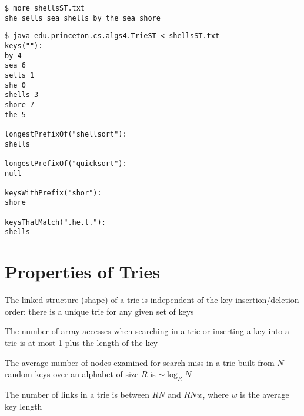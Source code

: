 \documentclass[8pt,a4paper,compress]{beamer}
\begin{document}
\begin{frame}[fragile]
\pause

\begin{lstlisting}[language={}]
$ more shellsST.txt 
she sells sea shells by the sea shore
\end{lstlisting}

\pause

\begin{lstlisting}[language={}]
$ java edu.princeton.cs.algs4.TrieST < shellsST.txt 
keys(""):
by 4
sea 6
sells 1
she 0
shells 3
shore 7
the 5

longestPrefixOf("shellsort"):
shells

longestPrefixOf("quicksort"):
null

keysWithPrefix("shor"):
shore

keysThatMatch(".he.l."):
shells
\end{lstlisting}
\end{frame}

\section{Properties of Tries}
\begin{frame}[fragile]
\pause

The linked structure (shape) of a trie is independent of the key insertion/deletion order: there is a unique trie for any given set of keys

\pause
\bigskip

The number of array accesses when searching in a trie or inserting
a key into a trie is at most 1 plus the length of the key

\pause
\bigskip

The average number of nodes examined for search miss in a trie built from $N$ random keys over an alphabet of size $R$ is $\sim \log_R N$

\pause
\bigskip

The number of links in a trie is between $RN$ and $RNw$, where $w$ is
the average key length
\end{frame}
\end{document}
